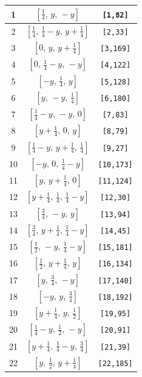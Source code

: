 \documentclass[fleqn,8pt]{jsarticle}
\begin{document}
\begin{longtable}{ccc}
1 & $\left[ \frac{1}{4},\, y,\, - y \right]$ & {\tt [1,82]} \\ \hline
2 & $\left[ \frac{1}{4},\, \frac{1}{4} - y,\, y + \frac{1}{4} \right]$ & {\tt [2,33]} \\ \hline
3 & $\left[ 0,\, y,\, y + \frac{1}{4} \right]$ & {\tt [3,169]} \\ \hline
4 & $\left[ 0,\, \frac{1}{4} - y,\, - y \right]$ & {\tt [4,122]} \\ \hline
5 & $\left[ - y,\, \frac{1}{4},\, y \right]$ & {\tt [5,128]} \\ \hline
6 & $\left[ y,\, - y,\, \frac{1}{4} \right]$ & {\tt [6,180]} \\ \hline
7 & $\left[ \frac{1}{4} - y,\, - y,\, 0 \right]$ & {\tt [7,83]} \\ \hline
8 & $\left[ y + \frac{1}{4},\, 0,\, y \right]$ & {\tt [8,79]} \\ \hline
9 & $\left[ \frac{1}{4} - y,\, y + \frac{1}{4},\, \frac{1}{4} \right]$ & {\tt [9,27]} \\ \hline
10 & $\left[ - y,\, 0,\, \frac{1}{4} - y \right]$ & {\tt [10,173]} \\ \hline
11 & $\left[ y,\, y + \frac{1}{4},\, 0 \right]$ & {\tt [11,124]} \\ \hline
12 & $\left[ y + \frac{1}{4},\, \frac{1}{4},\, \frac{1}{4} - y \right]$ & {\tt [12,30]} \\ \hline
13 & $\left[ \frac{3}{4},\, - y,\, y \right]$ & {\tt [13,94]} \\ \hline
14 & $\left[ \frac{3}{4},\, y + \frac{1}{4},\, \frac{1}{4} - y \right]$ & {\tt [14,45]} \\ \hline
15 & $\left[ \frac{1}{2},\, - y,\, \frac{1}{4} - y \right]$ & {\tt [15,181]} \\ \hline
16 & $\left[ \frac{1}{2},\, y + \frac{1}{4},\, y \right]$ & {\tt [16,134]} \\ \hline
17 & $\left[ y,\, \frac{3}{4},\, - y \right]$ & {\tt [17,140]} \\ \hline
18 & $\left[ - y,\, y,\, \frac{3}{4} \right]$ & {\tt [18,192]} \\ \hline
19 & $\left[ y + \frac{1}{4},\, y,\, \frac{1}{2} \right]$ & {\tt [19,95]} \\ \hline
20 & $\left[ \frac{1}{4} - y,\, \frac{1}{2},\, - y \right]$ & {\tt [20,91]} \\ \hline
21 & $\left[ y + \frac{1}{4},\, \frac{1}{4} - y,\, \frac{3}{4} \right]$ & {\tt [21,39]} \\ \hline
22 & $\left[ y,\, \frac{1}{2},\, y + \frac{1}{4} \right]$ & {\tt [22,185]} \\ \hline

\end{longtable}
\end{document}
